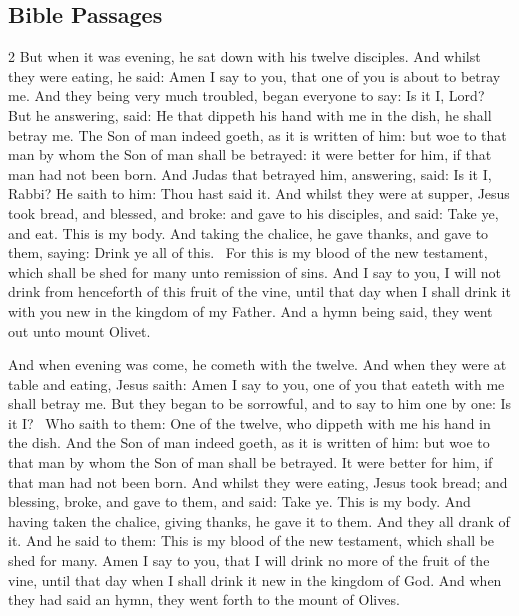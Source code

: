\subsection{Bible Passages}

\begin{multicols}{2}\small
But when it was evening, he sat down with his twelve disciples. And whilst they were eating, he said: Amen I say to you, that one of you is about to betray me. And they being very much troubled, began everyone to say: Is it I, Lord? But he answering, said: He that dippeth his hand with me in the dish, he shall betray me. The Son of man indeed goeth, as it is written of him: but woe to that man by whom the Son of man shall be betrayed: it were better for him, if that man had not been born. And Judas that betrayed him, answering, said: Is it I, Rabbi? He saith to him: Thou hast said it. And whilst they were at supper, Jesus took bread, and blessed, and broke: and gave to his disciples, and said: Take ye, and eat. This is my body. And taking the chalice, he gave thanks, and gave to them, saying: Drink ye all of this.  For this is my blood of the new testament, which shall be shed for many unto remission of sins. And I say to you, I will not drink from henceforth of this fruit of the vine, until that day when I shall drink it with you new in the kingdom of my Father. And a hymn being said, they went out unto mount Olivet. 

And when evening was come, he cometh with the twelve. And when they were at table and eating, Jesus saith: Amen I say to you, one of you that eateth with me shall betray me. But they began to be sorrowful, and to say to him one by one: Is it I?  Who saith to them: One of the twelve, who dippeth with me his hand in the dish. And the Son of man indeed goeth, as it is written of him: but woe to that man by whom the Son of man shall be betrayed. It were better for him, if that man had not been born. And whilst they were eating, Jesus took bread; and blessing, broke, and gave to them, and said: Take ye. This is my body. And having taken the chalice, giving thanks, he gave it to them. And they all drank of it. And he said to them: This is my blood of the new testament, which shall be shed for many. Amen I say to you, that I will drink no more of the fruit of the vine, until that day when I shall drink it new in the kingdom of God. And when they had said an hymn, they went forth to the mount of Olives. 


\end{multicols}

